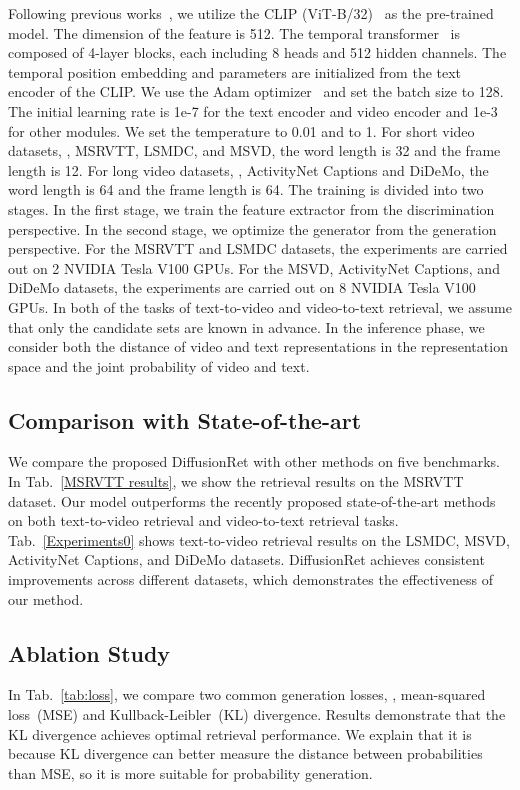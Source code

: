 \documentclass[10pt,twocolumn,letterpaper]{article}
\begin{document}
{
Following previous works~\cite{luo2021clip4clip,liu2022ts2,jin2022expectation,jin2022video}, we utilize the CLIP (ViT-B/32)~\cite{radford2021learning} as the pre-trained model. The dimension of the feature is 512. The temporal transformer~\cite{vaswani2017attention,li2022locality} is composed of 4-layer blocks, each including 8 heads and 512 hidden channels. The temporal position embedding and parameters are initialized from the text encoder of the CLIP. We use the Adam optimizer~\cite{kingma2014adam} and set the batch size to 128. The initial learning rate is 1e-7 for the text encoder and video encoder and 1e-3 for other modules. We set the temperature  to 0.01 and  to 1. For short video datasets, \ie, MSRVTT, LSMDC, and MSVD, the word length is 32 and the frame length is 12. For long video datasets, \ie, ActivityNet Captions and DiDeMo, the word length is 64 and the frame length is 64. The training is divided into two stages. In the first stage, we train the feature extractor from the discrimination perspective. In the second stage, we optimize the generator from the generation perspective. For the MSRVTT and LSMDC datasets, the experiments are carried out on 2 NVIDIA Tesla V100 GPUs. For the MSVD, ActivityNet Captions, and DiDeMo datasets, the experiments are carried out on 8 NVIDIA Tesla V100 GPUs. In both of the tasks of text-to-video and video-to-text retrieval, we assume that only the candidate sets are known in advance. In the inference phase, we consider both the distance of video and text representations in the representation space and the joint probability of video and text.

\subsection{Comparison with State-of-the-art}
We compare the proposed DiffusionRet with other methods on five benchmarks. In Tab.~{\ref{MSRVTT results}}, we show the retrieval results on the MSRVTT dataset. Our model outperforms the recently proposed state-of-the-art methods on both text-to-video retrieval and video-to-text retrieval tasks. Tab.~{\ref{Experiments0}} shows text-to-video retrieval results on the LSMDC, MSVD, ActivityNet Captions, and DiDeMo datasets. DiffusionRet achieves consistent improvements across different datasets, which demonstrates the effectiveness of our method. 


\subsection{Ablation Study}
 In Tab.~\ref{tab:loss}, we compare two common generation losses, \ie, mean-squared loss~(MSE) and Kullback-Leibler~(KL) divergence. Results demonstrate that the KL divergence achieves optimal retrieval performance. We explain that it is because KL divergence can better measure the distance between probabilities than MSE, so it is more suitable for probability generation.

}
\end{document}
